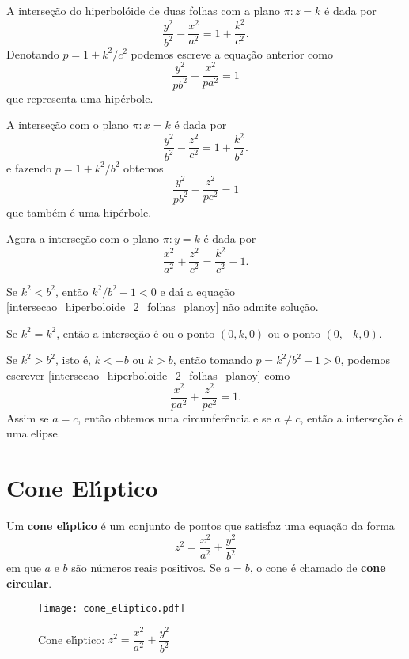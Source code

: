 A interse\c{c}\~ao do hiperbol\'oide de duas folhas com a plano $\pi: z = k$ \'e dada por
\[
	\dfrac{y^2}{b^2} - \dfrac{x^2}{a^2} = 1 +  \dfrac{k^2}{c^2}.
\]
Denotando $p = 1 + k^2/c^2$ podemos escreve a equa\c{c}\~ao anterior como
\[
	\dfrac{y^2}{pb^2} - \dfrac{x^2}{pa^2} = 1
\]
que representa uma hip\'erbole.

A interse\c{c}\~ao com o plano $\pi: x = k$ \'e dada por
\[
	\dfrac{y^2}{b^2} - \dfrac{z^2}{c^2} = 1 +  \dfrac{k^2}{b^2}.
\]
e fazendo $p = 1 + k^2/b^2$ obtemos
\[
	\dfrac{y^2}{pb^2} - \dfrac{z^2}{pc^2} = 1
\]
que tamb\'em \'e uma hip\'erbole.

Agora a interse\c{c}\~ao com o plano $\pi : y = k$ \'e dada por
\begin{equation}\label{intersecao_hiperboloide_2_folhas_planoy}
	\dfrac{x^2}{a^2} + \dfrac{z^2}{c^2} = \dfrac{k^2}{c^2} - 1.	
\end{equation}

Se $k^2 < b^2$, ent\~ao $k^2/b^2 - 1 < 0$ e da{\'\i} a equa\c{c}\~ao \eqref{intersecao_hiperboloide_2_folhas_planoy} n\~ao admite solu\c{c}\~ao.

Se $k^2 = k^2$, ent\~ao a interse\c{c}\~ao \'e ou o ponto $(0,k,0)$ ou o ponto $(0,-k,0)$.

Se $k^2 > b^2$, isto \'e, $k < -b$ ou $k > b$, ent\~ao tomando $p = k^2/b^2 - 1 > 0$, podemos escrever \eqref{intersecao_hiperboloide_2_folhas_planoy} como
\[
	\dfrac{x^2}{pa^2} + \dfrac{z^2}{pc^2} = 1.
\]
Assim se $a = c$, ent\~ao obtemos uma circunfer\^encia e se $a \ne c$, ent\~ao a interse\c{c}\~ao \'e uma elipse.


\section{Cone El{\'\i}ptico} %
\label{sec:cone_eliptico}

\begin{definicao}
	Um \textbf{cone el{\'\i}ptico} \'e um conjunto de pontos que satisfaz uma equa\c{c}\~ao da forma
	\begin{equation}\label{cone_eliptico}
		z^2 = \dfrac{x^2}{a^2} + \dfrac{y^2}{b^2}
	\end{equation}
	em que $a$ e $b$ s\~ao n\'umeros reais positivos. Se $a = b$, o cone \'e chamado de \textbf{cone circular}.
\end{definicao}

\begin{figure}[!hp]
	\centering
	\caption{Cone el{\'\i}ptico: $z^2 = \dfrac{x^2}{a^2} + \dfrac{y^2}{b^2}$}
	\texttt{[image: cone\_eliptico.pdf]}
\end{figure}

